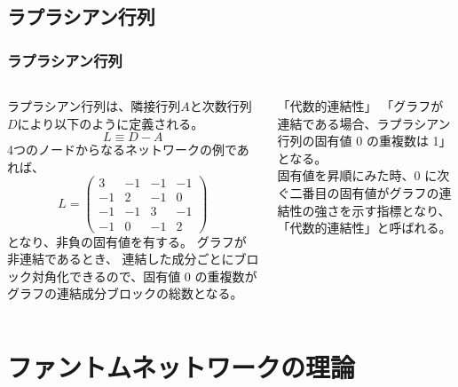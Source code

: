 \documentclass[11pt, dvipdfmx]{beamer}
\begin{document}
\subsection{ラプラシアン行列}
\begin{frame}
\frametitle{ラプラシアン行列}
\begin{columns}[totalwidth=1\textwidth]
ラプラシアン行列は、隣接行列$A$と次数行列$D$により以下のように定義される。
$$
L \equiv D-A
$$
4つのノードからなるネットワークの例であれば、
$$
L = \left( 
\begin{array}{cccc} 
 3 & -1 & -1 & -1 \\ 
-1 &  2 & -1 & 0 \\
-1 & -1 &  3 & -1 \\
-1 &  0 & -1 & 2 
\end{array} 
\right) 
$$
となり、非負の固有値を有する。
グラフが非連結であるとき、%
連結した成分ごとにブロック対角化できるので、固有値 0 の重複数がグラフの連結成分ブロックの総数となる。
\begin{block}{「代数的連結性」}
「グラフが連結である場合、ラプラシアン行列の固有値 0 の重複数は 1」となる。\\
固有値を昇順にみた時、0 に次ぐ二番目の固有値がグラフの連結性の強さを示す指標となり、「代数的連結性」と呼ばれる。
\end{block}
\end{columns}
\end{frame}


\section{ファントムネットワークの理論}
\end{document}
